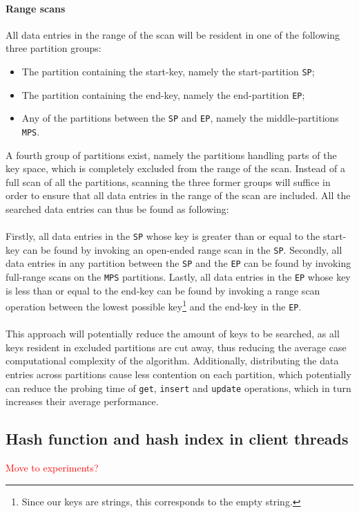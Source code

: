 \documentclass[11pt]{article} %
\begin{document}
\paragraph{Range scans} All data entries in the range of the scan will be resident in one of the following three partition groups:
\begin{itemize}[noitemsep]
  \item The partition containing the start-key, namely the start-partition \verb|SP|;
  \item The partition containing the end-key, namely the end-partition \verb|EP|;
  \item Any of the partitions between the \verb|SP| and \verb|EP|, namely the middle-partitions \verb|MPS|.
\end{itemize}
A fourth group of partitions exist, namely the partitions handling parts of the key space, which is completely excluded from the range of the scan. Instead of a full scan of all the partitions, scanning the three former groups will suffice in order to ensure that all data entries in the range of the scan are included. All the searched data entries can thus be found as following:\\
\\
Firstly, all data entries in the \verb|SP| whose key is greater than or equal to the start-key can be found by invoking an open-ended range scan in the \verb|SP|. Secondly, all data entries in any partition between the \verb|SP| and the \verb|EP| can be found by invoking full-range scans on the \verb|MPS| partitions. Lastly, all data entries in the \verb|EP| whose key is less than or equal to the end-key can be found by invoking a range scan operation between the lowest possible key\footnote{Since our keys are strings, this corresponds to the empty string.} and the end-key in the \verb|EP|.\\
\\
This approach will potentially reduce the amount of keys to be searched, as all keys resident in excluded partitions are cut away, thus reducing the average case computational complexity of the algorithm. Additionally, distributing the data entries across partitions cause less contention on each partition, which potentially can reduce the probing time of \verb|get|, \verb|insert| and \verb|update| operations, which in turn increases their average performance.

\subsection{Hash function and hash index in client threads}
\label{subsec:design_all_in_threads}
\textcolor{red}{Move to experiments?}
\newpage
\end{document}
